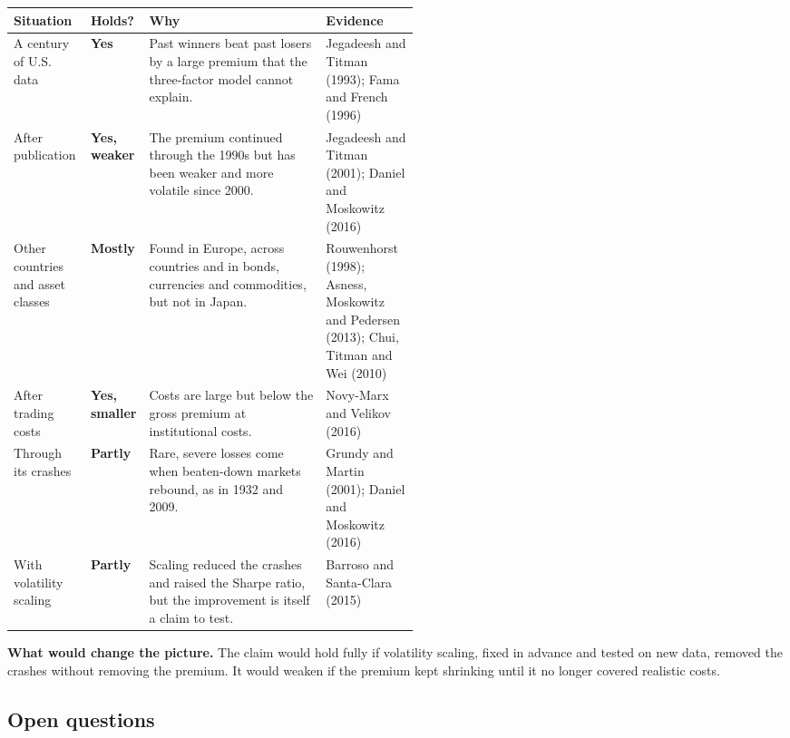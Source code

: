 \begin{center}
\small
\begin{tabularx}{\linewidth}{@{}>{\raggedright\arraybackslash}p{0.19\linewidth}>{\raggedright\arraybackslash}p{0.10\linewidth}>{\raggedright\arraybackslash}X>{\raggedright\arraybackslash}p{0.23\linewidth}@{}}
\toprule
Situation & Holds? & Why & Evidence \\
\midrule
A century of U.S. data & \textbf{Yes} & Past winners beat past losers by a large premium that the three-factor model cannot explain. & Jegadeesh and Titman (1993); Fama and French (1996) \\
\addlinespace[3pt]
After publication & \textbf{Yes, weaker} & The premium continued through the 1990s but has been weaker and more volatile since 2000. & Jegadeesh and Titman (2001); Daniel and Moskowitz (2016) \\
\addlinespace[3pt]
Other countries and asset classes & \textbf{Mostly} & Found in Europe, across countries and in bonds, currencies and commodities, but not in Japan. & Rouwenhorst (1998); Asness, Moskowitz and Pedersen (2013); Chui, Titman and Wei (2010) \\
\addlinespace[3pt]
After trading costs & \textbf{Yes, smaller} & Costs are large but below the gross premium at institutional costs. & Novy-Marx and Velikov (2016) \\
\addlinespace[3pt]
Through its crashes & \textbf{Partly} & Rare, severe losses come when beaten-down markets rebound, as in 1932 and 2009. & Grundy and Martin (2001); Daniel and Moskowitz (2016) \\
\addlinespace[3pt]
With volatility scaling & \textbf{Partly} & Scaling reduced the crashes and raised the Sharpe ratio, but the improvement is itself a claim to test. & Barroso and Santa-Clara (2015) \\
\bottomrule
\end{tabularx}
\end{center}

\textbf{What would change the picture.} The claim would hold fully if volatility scaling, fixed in advance and tested on new data, removed the crashes without removing the premium. It would weaken if the premium kept shrinking until it no longer covered realistic costs.

\subsection{Open questions}
\label{sec:05-open}


